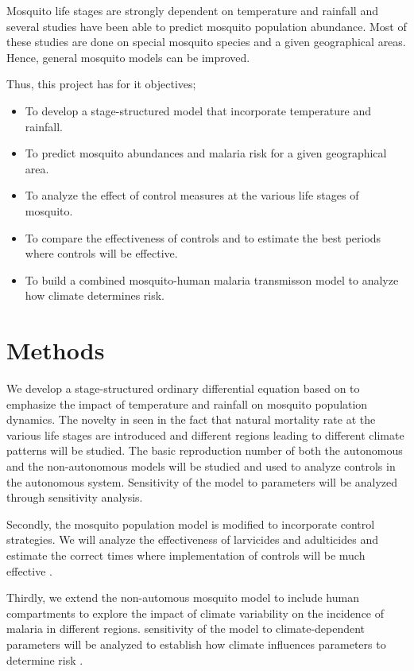\documentclass[12pt,a4paper,titlepage]{article}
\begin{document}
Mosquito life stages are strongly dependent on temperature and rainfall and several studies have been able to predict mosquito population abundance. Most of these studies are done on special mosquito species and a given geographical areas. Hence, general mosquito models can be improved. 

Thus, this project has for it objectives;

\begin{itemize}
\item To develop a stage-structured model that incorporate temperature and rainfall.
\item To predict mosquito abundances and malaria risk for a given geographical area.
\item To analyze the effect of control measures at the various life stages of mosquito.
\item To compare the effectiveness of controls and to estimate the best periods where controls will be effective. 
\item To build a combined mosquito-human malaria transmisson model to analyze how climate determines risk.  
\end{itemize}


\section{Methods}
We develop a stage-structured ordinary differential equation based on \cite{abdelrazec2017mathematical, hamdan2020effect, abiodun2016modelling} to emphasize the impact of temperature and rainfall on mosquito population dynamics. The novelty in seen in the fact that natural mortality rate at the various life stages are introduced and different regions leading to different climate patterns will be studied. The basic reproduction number of both the autonomous and the non-autonomous models will be studied and used to analyze controls in the autonomous system. Sensitivity of the model to parameters will be analyzed through sensitivity analysis. 

Secondly, the mosquito population model is modified to incorporate control strategies. We will analyze the effectiveness of larvicides and adulticides and estimate the correct times where implementation of controls will be much effective \cite{Ocspp2016SuccessIM}.

Thirdly, we extend the non-automous mosquito model to include human compartments to explore the impact of climate variability on the incidence of malaria in different regions. sensitivity of the model to climate-dependent parameters will be analyzed to establish how climate influences parameters to determine risk \cite{abiodun2016modelling}. 
\end{document}
